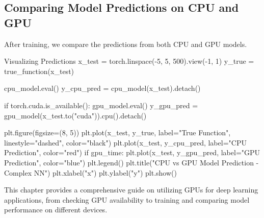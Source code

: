 \subsection{Comparing Model Predictions on CPU and GPU}
After training, we compare the predictions from both CPU and GPU models.

\begin{codeonly}{Visualizing Predictions}
x_test = torch.linspace(-5, 5, 500).view(-1, 1)
y_true = true_function(x_test)

cpu_model.eval()
y_cpu_pred = cpu_model(x_test).detach()

if torch.cuda.is_available():
    gpu_model.eval()
    y_gpu_pred = gpu_model(x_test.to("cuda")).cpu().detach()

plt.figure(figsize=(8, 5))
plt.plot(x_test, y_true, label="True Function", linestyle="dashed", color="black")
plt.plot(x_test, y_cpu_pred, label="CPU Prediction", color="red")
if gpu_time:
    plt.plot(x_test, y_gpu_pred, label="GPU Prediction", color="blue")
plt.legend()
plt.title("CPU vs GPU Model Prediction - Complex NN")
plt.xlabel("x")
plt.ylabel("y")
plt.show()
\end{codeonly}

This chapter provides a comprehensive guide on utilizing GPUs for deep learning applications, from checking GPU availability to training and comparing model performance on different devices.
